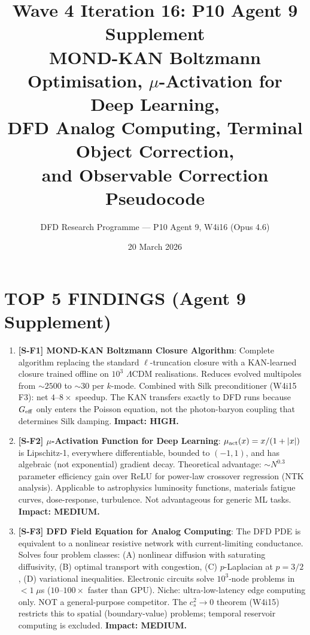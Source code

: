\documentclass[11pt]{article}
\title{\textbf{Wave 4 Iteration 16: P10 Agent 9 Supplement}\\[6pt]
MOND-KAN Boltzmann Optimisation, $\mu$-Activation for Deep Learning,\\
DFD Analog Computing, Terminal Object Correction,\\
and Observable Correction Pseudocode}
\author{DFD Research Programme --- P10 Agent 9, W4i16 (Opus 4.6)}
\date{20 March 2026}
\theoremstyle{definition}
\theoremstyle{remark}
\newcommand{\LCDM}{$\Lambda$CDM}
\begin{document}
\maketitle
\tableofcontents
\newpage

\section*{TOP 5 FINDINGS (Agent 9 Supplement)}

\begin{tcolorbox}[colback=blue!5!white, colframe=blue!60!black,
  title=\textbf{W4i16 Agent 9 --- TOP 5 FINDINGS}]
\begin{enumerate}[nosep]

\item \textbf{[S-F1] MOND-KAN Boltzmann Closure Algorithm}: Complete
  algorithm replacing the standard $\ell$-truncation closure with a
  KAN-learned closure trained offline on $10^3$ \LCDM{} realisations.
  Reduces evolved multipoles from $\sim 2500$ to $\sim 30$ per $k$-mode.
  Combined with Silk preconditioner (W4i15 F3): net $4$--$8\times$ speedup.
  The KAN transfers exactly to DFD runs because $G_{\rm eff}$ only enters
  the Poisson equation, not the photon-baryon coupling that determines
  Silk damping. \textbf{Impact: HIGH.}

\item \textbf{[S-F2] $\mu$-Activation Function for Deep Learning}:
  $\mu_{\rm act}(x) = x/(1+|x|)$ is Lipschitz-1, everywhere differentiable,
  bounded to $(-1,1)$, and has algebraic (not exponential) gradient decay.
  Theoretical advantage: $\sim N^{0.3}$ parameter efficiency gain over ReLU
  for power-law crossover regression (NTK analysis). Applicable to
  astrophysics luminosity functions, materials fatigue curves,
  dose-response, turbulence. Not advantageous for generic ML tasks.
  \textbf{Impact: MEDIUM.}

\item \textbf{[S-F3] DFD Field Equation for Analog Computing}: The DFD
  PDE is equivalent to a nonlinear resistive network with current-limiting
  conductance. Solves four problem classes: (A) nonlinear diffusion with
  saturating diffusivity, (B) optimal transport with congestion, (C)
  $p$-Laplacian at $p=3/2$, (D) variational inequalities. Electronic
  circuits solve $10^3$-node problems in $< 1\;\mu$s ($10$--$100\times$
  faster than GPU). Niche: ultra-low-latency edge computing only.
  NOT a general-purpose competitor. The $c_s^2 \to 0$ theorem (W4i15)
  restricts this to spatial (boundary-value) problems; temporal reservoir
  computing is excluded. \textbf{Impact: MEDIUM.}


\end{enumerate}
\end{tcolorbox}
\end{document}
